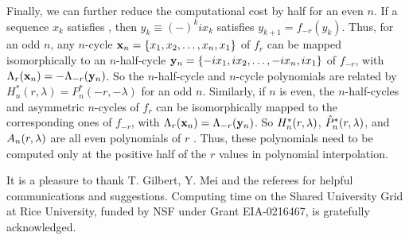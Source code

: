 \documentclass{ws-ijbc}
\begin{document}
Finally, we can further reduce the computational cost
  by half for an even $n$.
%
If a sequence $x_k$ satisfies ,
then $y_k \equiv (-)^k i x_k$
satisfies $y_{k+1} = f_{-r}(y_k)$.
%
Thus, for an odd $n$, any $n$-cycle
  $\mathbf{x}_{n} = \{x_1, x_2, \dots, x_n, x_1\}$
  of $f_r$
  can be mapped isomorphically to
  an $n$-half-cycle
  $\mathbf{y}_{n} = \{-i x_1, i x_2, \dots, - i x_n, i x_1\}$
  of $f_{-r}$,
  with $\Lambda_r(\mathbf{x}_{n}) = -\Lambda_{-r}(\mathbf{y}_{n})$.
%
So the $n$-half-cycle and $n$-cycle polynomials
  are related by
  $H^*_n(r, \lambda) = P^*_n(-r, -\lambda)$
  for an odd $n$.
%
Similarly, if $n$ is even,
  the $n$-half-cycles and asymmetric $n$-cycles of $f_r$
  can be isomorphically mapped to the corresponding ones of $f_{-r}$,
  with $\Lambda_r(\mathbf{x}_{n}) = \Lambda_{-r}(\mathbf{y}_{n})$.
%
So $H^*_{n}(r, \lambda)$,
  $\hat P^*_{n}(r, \lambda)$,
  and $A_{n}(r, \lambda)$
  are all even polynomials of $r$
.
%
Thus, these polynomials need to be computed only
  at the positive half of the $r$ values
  in polynomial interpolation.
%



 \noindent
It is a pleasure to thank T. Gilbert, Y. Mei and the referees
  for helpful communications and suggestions.
Computing time on the Shared University Grid at Rice University,
  funded by NSF under Grant EIA-0216467, is gratefully acknowledged.




\end{document}
